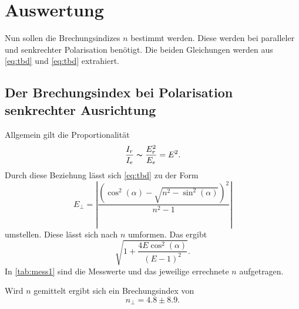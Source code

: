 \section{Auswertung}
\label{sec:Auswertung}

Nun sollen die Brechungsindizes $n$ bestimmt werden.
Diese werden bei paralleler und senkrechter Polarisation benötigt.
Die beiden Gleichungen werden aus \autoref{eq:tbd} und \autoref{eq:tbd} extrahiert.


\subsection{Der Brechungsindex bei Polarisation senkrechter Ausrichtung}

Allgemein gilt die Proportionalität 
\begin{equation}
  \frac{I_r}{I_e} \thicksim \frac{E_r^2}{E_e} = E^2.
\end{equation}
Durch diese Beziehung lässt sich \autoref{eq:tbd} zu der Form
\begin{equation*}
  E_{\perp}=\left|\frac{\left(\cos ^{2}(\alpha) - \sqrt{n^{2}-\sin ^{2}(\alpha)} \right)^{2}}{n^{2}-1}\right|
\end{equation*}
umstellen.
Diese lässt sich nach $n$ umformen.
Das ergibt
\begin{equation}
  \sqrt{1 + \frac{4 E \cos ^2(\alpha)}{(E - 1)^2}}.
\end{equation}
In \autoref{tab:mess1} sind die Messwerte und das jeweilige errechnete $n$ aufgetragen.

Wird $n$ gemittelt ergibt sich ein Brechungsindex von 
\begin{equation*}
  n_{\perp} = 4.8 ± 8.9. 
\end{equation*}



